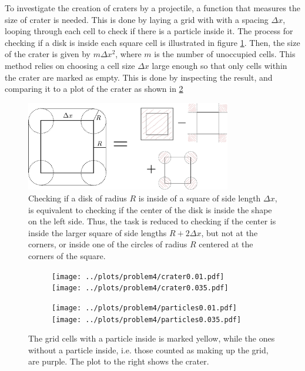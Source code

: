\documentclass{article}
\begin{document}
        To investigate the creation of craters by a projectile, a function that measures the size of crater is needed. This is done by laying a grid with with a spacing $\Delta x$, looping through each cell to check if there is a particle inside it. The process for checking if a disk is inside each square cell is illustrated in figure \ref{check if disk is inside}. Then, the size of the crater is given by $m \Delta x^2$, where $m$ is the number of unoccupied cells. This method relies on choosing a cell size $\Delta x$ large enough so that only cells within the crater are marked as empty. This is done by inspecting the result, and comparing it to a plot of the crater as shown in \ref{crater}

            \begin{figure}[ht]
                \centering
                \includegraphics[width=0.8\textwidth]{figure.pdf}
                \caption{Checking if a disk of radius $R$ is inside of a square of side length $\Delta x$, is equivalent to checking if the center of the disk is inside the shape on the left side. Thus, the task is reduced to checking if the center is inside the larger square of side lengths $R + 2 \Delta x$, but not at the corners, or inside one of the circles of radius $R$ centered at the corners of the square.}
                \label{check if disk is inside}
            \end{figure}
            \begin{figure}[h]
                \centering
                \begin{subfigure}{.4\textwidth}                    
                    \texttt{[image: ../plots/problem4/crater0.01.pdf]}
                    \texttt{[image: ../plots/problem4/crater0.035.pdf]}
                \end{subfigure}
                \begin{subfigure}{.59\textwidth}                    
                    \texttt{[image: ../plots/problem4/particles0.01.pdf]}
                    \texttt{[image: ../plots/problem4/particles0.035.pdf]}
                \end{subfigure}
                \caption{The grid cells with a particle inside is marked yellow, while the ones without a particle inside, i.e. those counted as making up the grid, are purple. The plot to the right shows the crater.}
                \label{crater}
            \end{figure}
\end{document}
